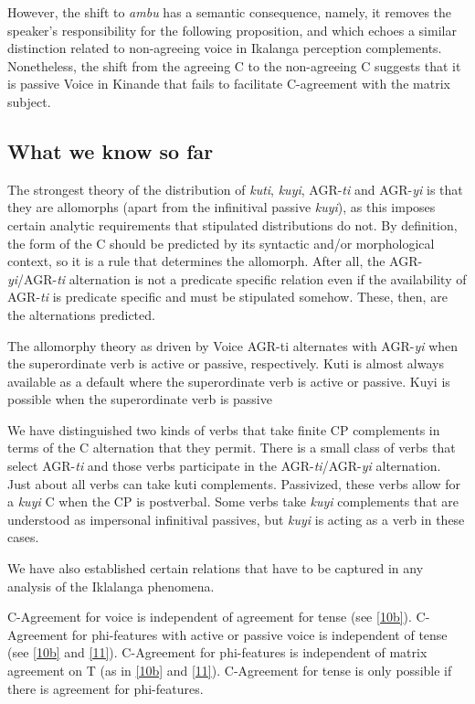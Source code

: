 \documentclass[output=paper,
modfonts
]{langscibook}
\begin{document}
However, the shift to \textit{ambu} has a semantic consequence, namely, it removes the speaker’s responsibility for the following proposition, and which echoes a similar distinction related to non-agreeing voice in Ikalanga perception complements. Nonetheless, the shift from the agreeing C to the non-agreeing C suggests that it is passive Voice in Kinande that fails to facilitate C-agreement with the matrix subject.

\subsection{What we know so far}
\label{sec:letsholo:3.2}
The strongest theory of the distribution of \textit{kuti}, \textit{kuyi}, AGR-\textit{ti} and AGR-\textit{yi} is that they are allomorphs (apart from the infinitival passive \textit{kuyi}), as this imposes certain analytic requirements that stipulated distributions do not. By definition, the form of the C should be predicted by its syntactic and/or morphological context, so it is a rule that determines the allomorph. After all, the AGR-\textit{yi}/AGR-\textit{ti} alternation is not a predicate specific relation even if the availability of AGR-\textit{ti} is predicate specific and must be stipulated somehow. These, then, are the alternations predicted.

\ea \label{Allo} \textup{The allomorphy theory as driven by Voice}
\ea \textup{AGR-ti alternates with AGR-\textit{yi} when the superordinate verb is active or passive, respectively.}
\ex Kuti \textup{is almost always available as a default where the superordinate verb is active or passive.}
\ex Kuyi \textup{is possible when the superordinate verb is passive} \z \z

We have distinguished two kinds of verbs that take finite CP complements in terms of the C alternation that they permit. There is a small class of verbs that select AGR-\textit{ti} and those verbs participate in the AGR-\textit{ti}/AGR-\textit{yi} alternation.  Just about all verbs can take kuti complements. Passivized, these verbs allow for a \textit{kuyi} C when the CP is postverbal. Some verbs take \textit{kuyi} complements that are understood as impersonal infinitival passives, but \textit{kuyi} is acting as a verb in these cases. 

We have also established certain relations that have to be captured in any analysis of the Iklalanga phenomena. 

\ea\label{n28} 
\ea	\textup{C-Agreement for voice is independent of agreement for tense (see \ref{10b}).} \label{n28a}
\ex	\textup{C-Agreement for phi-features with active or passive voice is independent of tense (see \ref{10b} and \ref{11}).} \label{n28b}
\ex \textup{C-Agreement for phi-features is independent of matrix agreement on T (as in \ref{10b} and \ref{11}).}\label{n28c}
\ex \textup{C-Agreement for tense is only possible if there is agreement for phi-features.}\label{n28d} \z\z 
\end{document}
